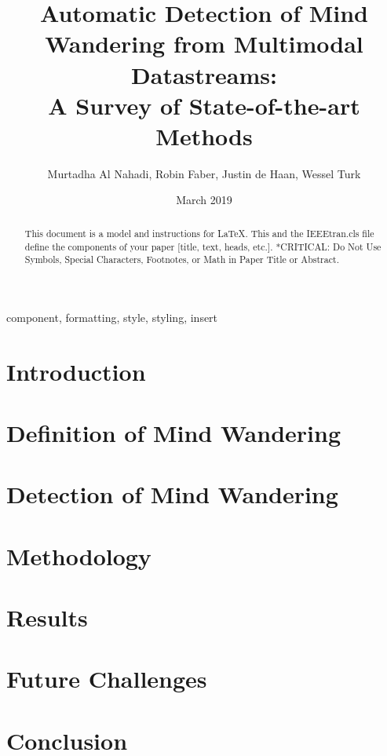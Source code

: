 \documentclass[conference]{IEEEtran}
\title{Automatic Detection of Mind Wandering from Multimodal Datastreams:\\ 
A Survey of State-of-the-art Methods}
\author{Murtadha Al Nahadi, Robin Faber, Justin de Haan, Wessel Turk}
\date{March 2019}
\begin{document}
\maketitle
\begin{abstract}
    This document is a model and instructions for \LaTeX.
    This and the IEEEtran.cls file define the components of your paper [title, text, heads, etc.]. *CRITICAL: Do Not Use Symbols, Special Characters, Footnotes, 
    or Math in Paper Title or Abstract.
    \end{abstract}
    
    \begin{IEEEkeywords}
    component, formatting, style, styling, insert
    \end{IEEEkeywords}


\section{Introduction}


\section{Definition of Mind Wandering}

\section{Detection of Mind Wandering}

\section{Methodology}

\section{Results}

\section{Future Challenges}


\section{Conclusion}

\printbibliography
\end{document}
